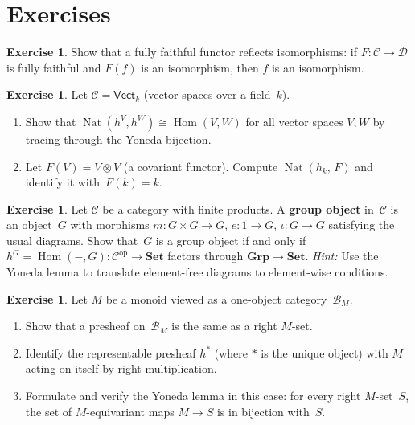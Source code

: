 \documentclass[a4paper,12pt]{book}
\DeclareMathOperator{\Hom}{Hom}
\DeclareMathOperator{\Nat}{Nat}
\newcommand{\Set}{\mathbf{Set}}
\newcommand{\Grp}{\mathbf{Grp}}
\newcommand{\op}{\mathrm{op}}
\theoremstyle{definition}
\newtheorem{exercise}[definition]{Exercise}
\theoremstyle{plain}
\theoremstyle{remark}
\begin{document}
\section{Exercises}\label{sec:yoneda-exercises}

\begin{exercise}\label{exer:ff-reflects-iso}
Show that a fully faithful functor reflects isomorphisms: if
$F\colon\mathcal{C}\to\mathcal{D}$ is fully faithful and $F(f)$
is an isomorphism, then $f$ is an isomorphism.
\end{exercise}

\begin{exercise}\label{exer:yoneda-explicit}
Let $\mathcal{C} = \mathsf{Vect}_k$ (vector spaces over a field~$k$).
\begin{enumerate}[label=(\alph*)]
\item Show that $\Nat(h^V,h^W)\cong\Hom(V,W)$ for all vector
    spaces $V,W$ by tracing through the Yoneda bijection.
\item Let $F(V) = V\otimes V$ (a covariant functor).  Compute
    $\Nat(h_k,\,F)$ and identify it with~$F(k) = k$.
\end{enumerate}
\end{exercise}

\begin{exercise}\label{exer:group-as-presheaf}
Let $\mathcal{C}$ be a category with finite products.  A \textbf{group
object} in~$\mathcal{C}$ is an object~$G$ with morphisms
$m\colon G\times G\to G$, $e\colon 1\to G$, $\iota\colon G\to G$
satisfying the usual diagrams.  Show that~$G$ is a group object if and
only if $h^G = \Hom(-,G)\colon\mathcal{C}^{\op}\to\Set$ factors through
$\Grp\to\Set$.
\emph{Hint:} Use the Yoneda lemma to translate element-free diagrams
to element-wise conditions.
\end{exercise}

\begin{exercise}\label{exer:yoneda-monoid}
Let $M$ be a monoid viewed as a one-object category~$\mathcal{B}_M$.
\begin{enumerate}[label=(\alph*)]
\item Show that a presheaf on~$\mathcal{B}_M$ is the same as a
    right $M$-set.
\item Identify the representable presheaf $h^{*}$ (where $*$ is
    the unique object) with $M$ acting on itself by right multiplication.
\item Formulate and verify the Yoneda lemma in this case: for every
    right $M$-set~$S$, the set of $M$-equivariant maps $M\to S$
    is in bijection with~$S$.
\end{enumerate}
\end{exercise}
\end{document}
